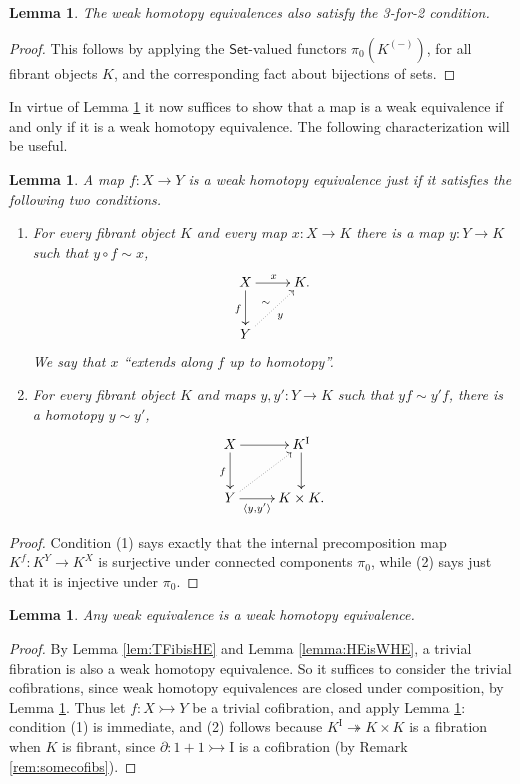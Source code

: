 \documentclass[11pt,reqno]{amsart}
\newcommand{\Set}{\ensuremath{\mathsf{Set}}}
\newcommand{\mono}{\ensuremath{\rightarrowtail}}
\newcommand{\ra}{\ensuremath{\rightarrow}}
\newcommand{\cof}{\ensuremath{\rightarrowtail}}
\newcommand{\fib}{\ensuremath{\twoheadrightarrow}}
\newcommand{\I}{\ensuremath{\mathrm{I}}}
\newcommand{\del}{\ensuremath{\partial}}
\newtheorem{lemma}[theorem]{Lemma}
\theoremstyle{remark}
\theoremstyle{definition}
\begin{document}
\begin{lemma}\label{lemma:WHE342}
The weak homotopy equivalences also satisfy the 3-for-2 condition. 
\end{lemma}
\begin{proof}
This follows by applying the $\Set$-valued functors $\pi_0(K^{(-)})$, for all fibrant objects $K$, and the corresponding fact about bijections of sets.
\end{proof}

In virtue of Lemma \ref{lemma:WHE342} it now suffices to show that a map is a weak equivalence if and only if it is a weak homotopy equivalence.   The following characterization will be useful.

\begin{lemma}\label{lem:WHEunwound}
A map $f : X\ra Y$ is a weak homotopy equivalence just if it satisfies the following two conditions.
\begin{enumerate}
\item For every fibrant object $K$ and every map $x : X \ra K$ there is a map $y:Y\ra K$ such that $y\circ f \sim x$,
\[
\xymatrix{
X \ar[d]_{f} \ar[r]^{x}  & K.\\
Y \ar@{..>}[ru]_{y}^{\sim} &
}
\]
We say that $x$ ``extends along $f$ up to homotopy''.
\item For every fibrant object $K$ and maps $y, y' : Y \ra K$ such that $yf \sim y'f$, there is a homotopy $y\sim y'$,
\[
\xymatrix{
X \ar[d]_{f} \ar[r]  & K^\I\ar[d] \\
Y \ar@{..>}[ru] \ar[r]_-{\langle y,y'\rangle} & K\times K.
}
\]
\end{enumerate}
\end{lemma}
\begin{proof}
Condition (1) says exactly that the internal precomposition map $K^f : K^Y \ra K^X$ is surjective under connected components $\pi_0$, while (2) says just that it is injective under $\pi_0$.
\end{proof}

\begin{lemma}\label{lem:WEimpliesWHE}
Any weak equivalence is a weak homotopy equivalence.
\end{lemma}

\begin{proof}
By Lemma \ref{lem:TFibisHE} and Lemma \ref{lemma:HEisWHE}, a trivial fibration is also a weak homotopy equivalence. So it suffices to consider the trivial cofibrations, since weak homotopy equivalences are closed under composition, by Lemma \ref{lemma:WHE342}.   Thus let $f : X \mono Y$ be a trivial cofibration, and apply Lemma \ref{lem:WHEunwound}: condition (1) is immediate, and (2) follows because $K^\I \fib K\times K$ is a fibration when $K$ is fibrant, since $\del : 1+1 \cof \I$ is a cofibration (by Remark \ref{rem:somecofibs}).
\end{proof}
\end{document}
